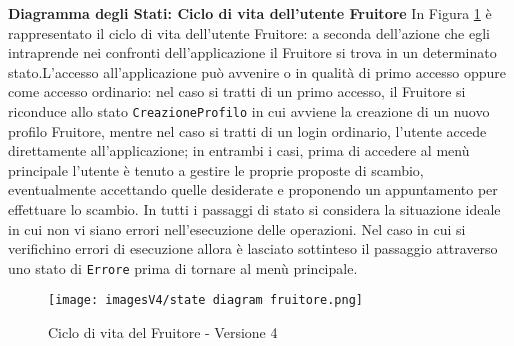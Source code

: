 \textbf{Diagramma degli Stati: Ciclo di vita dell'utente Fruitore}\newline
In Figura \ref{fig:State diagram 4.2} è rappresentato il ciclo di vita dell'utente Fruitore: a seconda dell'azione che egli intraprende nei confronti dell'applicazione il Fruitore si trova in un determinato stato.\newline L'accesso all'applicazione può avvenire o in qualità di primo accesso oppure come accesso ordinario: nel caso si tratti di un primo accesso, il Fruitore si riconduce allo stato \texttt{CreazioneProfilo} in cui avviene la creazione di un nuovo profilo Fruitore, mentre nel caso si tratti di un login ordinario, l'utente accede direttamente all'applicazione; in entrambi i casi, prima di accedere al menù principale l'utente è tenuto a gestire le proprie proposte di scambio, eventualmente accettando quelle desiderate e proponendo un appuntamento per effettuare lo scambio.\newline 
In tutti i passaggi di stato si considera la situazione ideale in cui non vi siano errori nell'esecuzione delle operazioni. Nel caso in cui si verifichino errori di esecuzione allora è lasciato sottinteso il passaggio attraverso uno stato di \texttt{Errore} prima di tornare al menù principale.

\begin{figure}[!]
\centering
\texttt{[image: imagesV4/state diagram fruitore.png]}
\caption{\label{fig:State diagram 4.2}Ciclo di vita del Fruitore - Versione 4}
\end{figure}\bigskip
